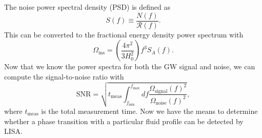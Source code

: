 The noise power spectral density (PSD) is defined as
\cite[eq. 3.1]{gowling_lisa_2021}
\begin{equation}
S(f) \equiv \frac{N(f)}{\mathcal{R}(f)}.
\end{equation}
This can be converted to the fractional energy density power spectrum with
\cites[eq. 3.8]{gowling_lisa_2021}[eq. 59]{smith_lisa_2019}
\begin{equation}
\Omega_\text{ins} = \left( \frac{4 \pi^2}{3 H_0^2} \right) f^3 S_A(f).
\end{equation}
Now that we know the power spectra for both the GW signal and noise, we can compute the signal-to-noise ratio with
\cites[eq. 50]{smith_lisa_2019}[eq. 33]{caprini_detecting_2020}[eq. 21]{thrane_sensitivity_2013}
\begin{equation}
\text{SNR} = \sqrt{t_\text{meas} \int_{f_\text{min}}^{f_\text{max}} df \frac{\Omega_\text{signal}(f)^2}{\Omega_\text{noise}(f)^2}},
\end{equation}
where $t_\text{meas}$ is the total measurement time.
Now we have the means to determine whether a phase transition with a particular fluid profile can be detected by LISA.
